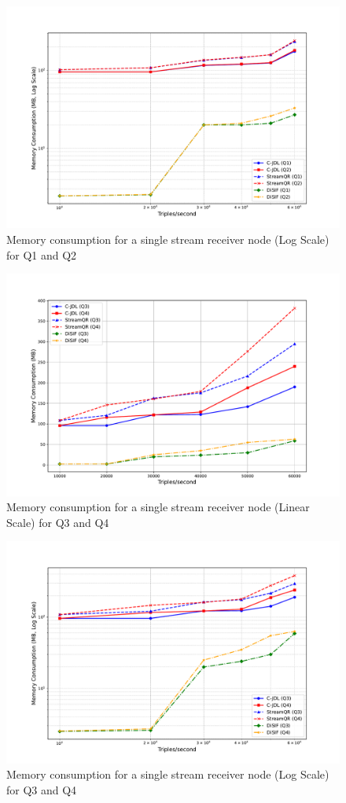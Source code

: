 \documentclass[5p,times]{elsarticle}
\begin{document}
\begin{figure}[t] %
  \centering
  \includegraphics[width=0.8\columnwidth]{Memory_Consumption_vs_Stream_Rate_Log_Enhanced_Q1Q2.pdf}
  \caption{Memory consumption for a single stream receiver node (Log Scale) for Q1 and Q2}
  \label{fig:Memexperiment11}
\end{figure}

\begin{figure}[t] %
  \centering
  \includegraphics[width=0.8\columnwidth]{Memory_Consumption_vs_Stream_Rate_Linear_Enhanced_Q3Q4.pdf}
  \caption{Memory consumption for a single stream receiver node (Linear Scale) for Q3 and Q4}
  \label{fig:Memexperiment2}
\end{figure}

\begin{figure}[t] %
  \centering
  \includegraphics[width=0.8\columnwidth]{Memory_Consumption_vs_Stream_Rate_Log_Enhanced_Q3Q4.pdf}
  \caption{Memory consumption for a single stream receiver node (Log Scale) for Q3 and Q4}
  \label{fig:Memexperiment22}
\end{figure}
\end{document}
